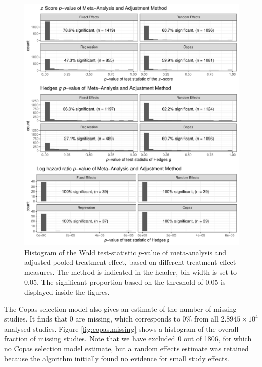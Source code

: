 \begin{figure}
\begin{knitrout}
\color{fgcolor}

{\centering \includegraphics[width=\textwidth-3cm]{figure/ch03_figunnamed-chunk-9-1} 

}



\end{knitrout}
\caption{Histogram of the Wald test-statistic $p$-value of meta-analysis and adjusted pooled treatment effect, based on different treatment effect measures. The method is indicated in the header, bin width is set to 0.05. The significant proportion based on the threshold of 0.05 is displayed inside the figures.}
\label{fig:adjustment.stat}
\end{figure}

The Copas selection model also gives an estimate of the number of missing studies. It finds that 0 are missing, which corresponds to 0\% from all \ensuremath{2.8945\times 10^{4}} analysed studies. Figure \ref{fig:copas.missing} shows a histogram of the overall fraction of missing studies. Note that we have excluded 0 out of 1806, for which no Copas selection model estimate, but a random effects estimate was retained because the algorithm initially found no evidence for small study effects.

